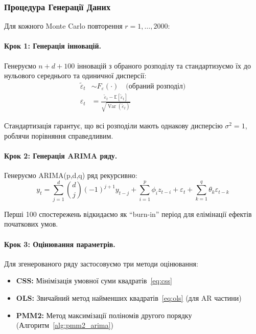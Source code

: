 \documentclass[12pt,a4paper]{article}
\DeclareMathOperator{\Var}{Var}
\newcommand{\E}{\mathbb{E}}
\begin{document}
\subsubsection{Процедура Генерації Даних}

Для кожного Monte Carlo повторення $r = 1, \ldots, 2000$:

\paragraph{Крок 1: Генерація інновацій.}

Генеруємо $n + d + 100$ інновацій з обраного розподілу та стандартизуємо їх до нульового середнього та одиничної дисперсії:
\begin{align}
\tilde{\varepsilon}_t &\sim F_{\varepsilon}(\cdot) \quad \text{(обраний розподіл)} \label{eq:raw_innovations} \\
\varepsilon_t &= \frac{\tilde{\varepsilon}_t - \E[\tilde{\varepsilon}_t]}{\sqrt{\Var(\tilde{\varepsilon}_t)}} \label{eq:standardized_innovations}
\end{align}

Стандартизація гарантує, що всі розподіли мають однакову дисперсію $\sigma^2 = 1$, роблячи порівняння справедливим.

\paragraph{Крок 2: Генерація ARIMA ряду.}

Генеруємо ARIMA(p,d,q) ряд рекурсивно:
\begin{equation}
\label{eq:arima_generation}
y_t = \sum_{j=1}^{d} \binom{d}{j} (-1)^{j+1} y_{t-j} + \sum_{i=1}^{p} \phi_i z_{t-i} + \varepsilon_t + \sum_{k=1}^{q} \theta_k \varepsilon_{t-k}
\end{equation}

Перші 100 спостережень відкидаємо як ``burn-in'' період для елімінації ефектів початкових умов.

\paragraph{Крок 3: Оцінювання параметрів.}

Для згенерованого ряду застосовуємо три методи оцінювання:
\begin{itemize}
    \item \textbf{CSS:} Мінімізація умовної суми квадратів~\eqref{eq:css}
    \item \textbf{OLS:} Звичайний метод найменших квадратів~\eqref{eq:ols} (для AR частини)
    \item \textbf{PMM2:} Метод максимізації поліномів другого порядку (Алгоритм~\ref{alg:pmm2_arima})
\end{itemize}
\end{document}

